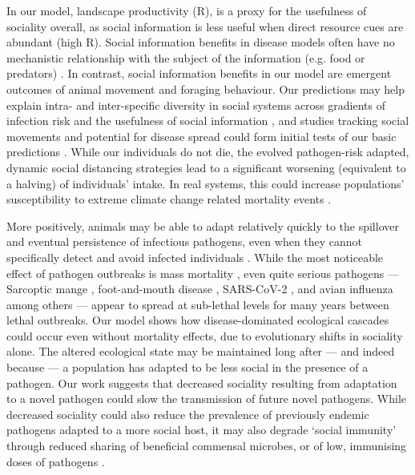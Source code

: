 In our model, landscape productivity (R), is a proxy for the usefulness of sociality overall, as social information is less useful when direct resource cues are abundant (high R).
Social information benefits in disease models often have no mechanistic relationship with the subject of the information (e.g. food or predators) \autocite{ashby2022}. 
In contrast, social information benefits in our model are emergent outcomes of animal movement and foraging behaviour. 
Our predictions may help explain intra- and inter-specific diversity in social systems across gradients of infection risk and the usefulness of social information \autocite{altizer2003,sah2018}, and studies tracking social movements and potential for disease spread could form initial tests of our basic predictions \autocite{wilber2022}.
While our individuals do not die, the evolved pathogen-risk adapted, dynamic social distancing strategies \autocite{stockmaier2021} lead to a significant worsening (equivalent to a halving) of individuals' intake.
In real systems, this could increase populations' susceptibility to extreme climate change related mortality events \autocite{fey2015}.

More positively, animals may be able to adapt relatively quickly to the spillover and eventual persistence of infectious pathogens, even when they cannot specifically detect and avoid infected individuals \autocite{altizer2003,stroeymeyt2018,stockmaier2021,pusceddu2021}.
While the most noticeable effect of pathogen outbreaks is mass mortality \autocite{fey2015}, even quite serious pathogens --- Sarcoptic mange \autocite{almberg2015}, foot-and-mouth disease \autocite{jolles2021,bastos2000,vosloo2009}, SARS-CoV-2 \autocite{chandler2021,kuchipudi2022}, and avian influenza \autocite{globconsorth5n82016,wille2022} among others --- appear to spread at sub-lethal levels for many years between lethal outbreaks.
Our model shows how disease-dominated ecological cascades \autocite{monk2022} 
could occur even without mortality effects, due to evolutionary shifts in sociality alone.
The altered ecological state \autocite[here, less resource consumption, as in][]{monk2022} may be maintained long after --- and indeed because --- a population has adapted to be less social in the presence of a pathogen.
Our work suggests that decreased sociality resulting from adaptation to a novel pathogen could slow the transmission of future novel pathogens. 
While decreased sociality could also reduce the prevalence of previously endemic pathogens adapted to a more social host, it may also degrade `social immunity' through reduced sharing of beneficial commensal microbes, or of low, immunising doses of pathogens \autocite{ezenwa2016,almberg2015}.


